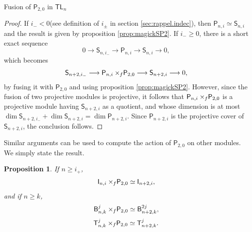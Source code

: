 \documentclass[reqno]{amsart}
\newtheorem{Prop}[Thm]{Proposition}
\newcommand{\tl}[1]{\mathsf{TL}_{#1}}
\newcommand{\ds}[1]{\mathsf S_{#1}}
\newcommand{\dl}[1]{\mathsf I_{#1}}
\newcommand{\dP}[1]{\mathsf P_{#1}}
\newcommand{\xf}{\times\hspace{-0.27em}_f}
\newcommand{\T}[2]{\mathsf{T}^{#1}_{#2}}
\newcommand{\B}[2]{\mathsf{B}^{#1}_{#2}}
\begin{document}
\begin{section}{Fusion of $\dP{2,0}$ in $\tl{n}$}
\begin{proof}
If $i_{-}<0$(see definition of $i_{\pm}$ in section \ref{sec:rappel.indec}), then $\dP{n,i} \simeq \ds{n,i}$ and the result is given by proposition \ref{prop:magickSP2}. If $i_{-} \geq 0$, there is a short exact sequence
\begin{equation}
0 \longrightarrow \ds{n,i_{-}} \longrightarrow \dP{n,i} \longrightarrow \ds{n,i} \longrightarrow 0,
\end{equation}
which becomes 
\begin{equation}
\ds{n+2,i_{-}} \longrightarrow \dP{n,i}\xf\dP{2,0} \longrightarrow \ds{n+2,i} \longrightarrow 0,
\end{equation}
by fusing it with $\dP{2,0}$ and using proposition \ref{prop:magickSP2}. However, since the fusion of two projective modules is projective, it follows that $\dP{n,i}\xf\dP{2,0} $ is a projective module having $\ds{n+2,i}$ as a quotient, and whose dimension is at most $\dim \ds{n+2,i_{-}} + \dim \ds{n+2,i} = \dim \dP{n+2,i}$. Since $\dP{n+2,i}$ is the projective cover of $\ds{n+2,i}$, the conclusion follows.
\end{proof}
Similar arguments can be used to compute the action of $\dP{2,0}$ on other modules. We simply state the result.
\begin{Prop}\label{prop:magickOthersP}
If $n\geq i_{+}$, $$\dl{n,i} \xf \dP{2,0} \simeq \dl{n+2,i}, $$
and if $n\geq k$, $$\B{j}{n,k}\xf \dP{2,0} \simeq \B{2j}{n+2,k}, $$ $$\T{j}{n,k}\xf \dP{2,0} \simeq \T{j}{n+2,k}.$$
\end{Prop}
\end{section}
\end{document}
